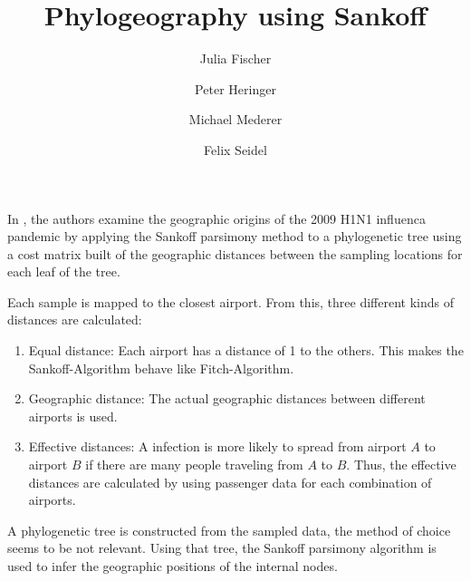 \documentclass{article}
\title{Phylogeography using Sankoff}
\author{Julia Fischer 
\and 
Peter Heringer
\and
Michael Mederer
\and
Felix Seidel}
\begin{document}
\maketitle

In \cite{reimering2020phylogeographic}, the authors examine the geographic
origins of the 2009 H1N1 influenca pandemic by applying the Sankoff parsimony
method to a phylogenetic tree using a cost matrix built of the geographic
distances between the sampling locations for each leaf of the tree.

Each sample is mapped to the closest airport. From this, three different kinds
of distances are calculated:
\begin{enumerate}
    \item Equal distance: Each airport has a distance of 1 to the others. This
    makes the Sankoff-Algorithm behave like Fitch-Algorithm.
    \item Geographic distance: The actual geographic distances between different
    airports is used.
    \item Effective distances: A infection is more likely to spread from
    airport $A$ to airport $B$ if there are many people traveling from $A$ to
    $B$. Thus, the effective distances are calculated by using passenger data
    for each combination of airports.
\end{enumerate}

A phylogenetic tree is constructed from the sampled data, the method of choice
seems to be not relevant. Using that tree, the Sankoff parsimony algorithm is
used to infer the geographic positions of the internal nodes.

\printbibliography
\end{document}
